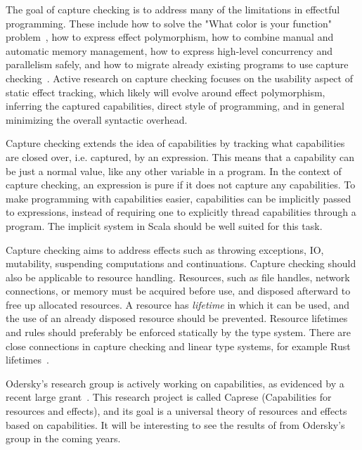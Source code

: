 The goal of capture checking is to address many of the limitations in effectful programming. These include how to solve the "What color is your function" problem~\cite{what-color-is-your-function}, how to express effect polymorphism, how to combine manual and automatic memory management, how to express high-level concurrency and parallelism safely, and how to migrate already existing programs to use capture checking~\cite{odersky-twitter-caprese}. Active research on capture checking focuses on the usability aspect of static effect tracking, which likely will evolve around effect polymorphism, inferring the captured capabilities, direct style of programming, and in general minimizing the overall syntactic overhead.

Capture checking extends the idea of capabilities by tracking what capabilities are closed over, i.e. captured, by an expression. This means that a capability can be just a normal value, like any other variable in a program. In the context of capture checking, an expression is pure if it does not capture any capabilities. To make programming with capabilities easier, capabilities can be implicitly passed to expressions, instead of requiring one to explicitly thread capabilities through a program. The implicit system in Scala should be well suited for this task.

Capture checking aims to address effects such as throwing exceptions, IO, mutability, suspending computations and continuations. Capture checking should also be applicable to resource handling. Resources, such as file handles, network connections, or memory must be acquired before use, and disposed afterward to free up allocated resources. A resource has \emph{lifetime} in which it can be used, and the use of an already disposed resource should be prevented. Resource lifetimes and rules should preferably be enforced statically by the type system. There are close connections in capture checking and linear type systems, for example Rust lifetimes~\cite{rust-lifetimes}.

Odersky's research group is actively working on capabilities, as evidenced by a recent large grant~\cite{capture-checking-grant}. This research project is called Caprese (Capabilities for resources and effects), and its goal is a universal theory of resources and effects based on capabilities. It will be interesting to see the results of from Odersky's group in the coming years.
